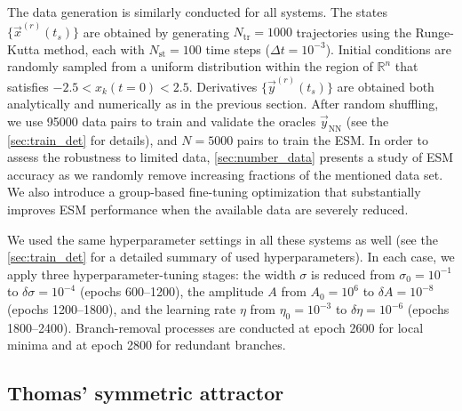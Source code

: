 The data generation is similarly conducted for all systems. The states $\{ \vec{x}^{(r)} (t_s) \}$ are obtained by generating $N_{\mathrm{tr}} = 1000$ trajectories using the Runge-Kutta method, each with $N_{\mathrm{st}} = 100$ time steps ($\Delta t = 10^{-3}$). Initial conditions are randomly sampled from a uniform distribution within the region of $\mathbb{R}^n$ that satisfies $-2.5 < x_k (t=0) < 2.5$. Derivatives $\{ \vec{y}^{(r)} (t_s) \}$ are obtained both analytically and numerically as in the previous section. After random shuffling, we use 95000 data pairs to train and validate the oracles $\vec{y}_{\mathrm{NN}}$ (see the \ref{sec:train_det} for details), and $N = 5000$ pairs to train the ESM. In order to assess the robustness to limited data, \ref{sec:number_data} presents a study of ESM accuracy as we randomly remove increasing fractions of the mentioned data set. We also introduce a group-based fine-tuning optimization that substantially improves ESM performance when the available data are severely reduced.


We used the same hyperparameter settings in all these systems as well (see the \ref{sec:train_det} for a detailed summary of used hyperparameters). In each case, we apply three hyperparameter-tuning stages: the width $\sigma$ is reduced from $\sigma_0 = 10^{-1}$ to $\delta\sigma = 10^{-4}$ (epochs 600–1200), the amplitude $A$ from $A_0 = 10^{6}$ to $\delta A = 10^{-8}$ (epochs 1200–1800), and the learning rate $\eta$ from $\eta_0 = 10^{-3}$ to $\delta \eta = 10^{-6}$ (epochs 1800–2400). Branch-removal processes are conducted at epoch 2600 for local minima and at epoch 2800 for redundant branches.





\subsection{Thomas' symmetric attractor}\label{sec:thomas}

